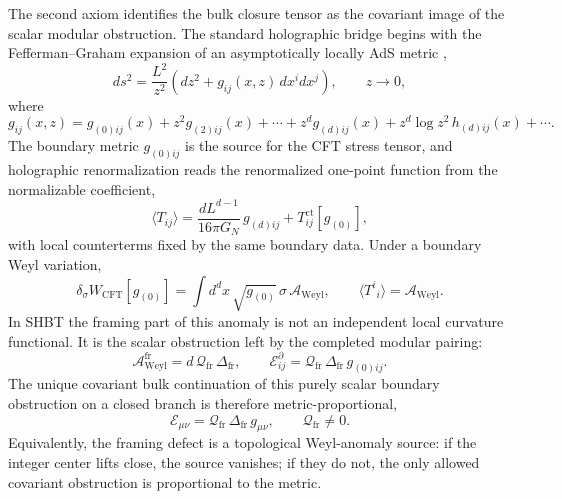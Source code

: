 \documentclass[11pt,letterpaper]{article}
\theoremstyle{plain}
\newcommand{\Deltafr}{\Delta_{\text{fr}}}
\newcommand{\GN}{G_N}
\newcommand{\Ebulk}{\mathcal E_{\mu\nu}}
\begin{document}
The second axiom identifies the bulk closure tensor as the covariant image of
the scalar modular obstruction.  The standard holographic bridge begins with
the Fefferman--Graham expansion of an asymptotically locally AdS metric
\cite{deharo2001,skenderis2002},
\begin{equation}
\label{eq:section-two-fg-metric}
 ds^2
 =
 \frac{L^2}{z^2}
 \left(dz^2+g_{ij}(x,z)\,dx^i dx^j\right),
 \qquad
 z\to0,
\end{equation}
where
\begin{equation}
\label{eq:section-two-fg-expansion}
 g_{ij}(x,z)
 =
 g_{(0)ij}(x)
 +z^2g_{(2)ij}(x)
 +\cdots
 +z^d g_{(d)ij}(x)
 +z^d\log z^2\,h_{(d)ij}(x)
 +\cdots .
\end{equation}
The boundary metric $g_{(0)ij}$ is the source for the CFT stress tensor, and
holographic renormalization reads the renormalized one-point function from the
normalizable coefficient,
\begin{equation}
\label{eq:section-two-holographic-stress-tensor}
 \langle T_{ij}\rangle
 =
 \frac{dL^{d-1}}{16\pi\GN}\,g_{(d)ij}
 +T^{\text{ct}}_{ij}[g_{(0)}],
\end{equation}
with local counterterms fixed by the same boundary data.  Under a boundary Weyl
variation,
\begin{equation}
\label{eq:section-two-weyl-anomaly}
 \delta_{\sigma}W_{\text{CFT}}[g_{(0)}]
 =
 \int d^d x\,\sqrt{g_{(0)}}\,\sigma\,\mathcal A_{\text{Weyl}},
 \qquad
 \langle T^i{}_{i}\rangle=\mathcal A_{\text{Weyl}}.
\end{equation}
In SHBT the framing part of this anomaly is not an independent local curvature
functional.  It is the scalar obstruction left by the completed modular
pairing:
\begin{equation}
\label{eq:section-two-framing-weyl-anomaly}
 \mathcal A_{\text{Weyl}}^{\text{fr}}
 =
 d\,\mathcal Q_{\text{fr}}\,\Deltafr,
 \qquad
 \mathcal E^{\partial}_{ij}
 =
 \mathcal Q_{\text{fr}}\,\Deltafr\,g_{(0)ij}.
\end{equation}
The unique covariant bulk continuation of this purely scalar boundary
obstruction on a closed branch is therefore metric-proportional,
\begin{equation}
\label{eq:section-two-closure-map}
 \boxed{
 \Ebulk
 =
 \mathcal Q_{\text{fr}}\,\Deltafr\,g_{\mu\nu},}
 \qquad
 \mathcal Q_{\text{fr}}\ne0.
\end{equation}
Equivalently, the framing defect is a topological Weyl-anomaly source: if the
integer center lifts close, the source vanishes; if they do not, the only
allowed covariant obstruction is proportional to the metric.
\end{document}
